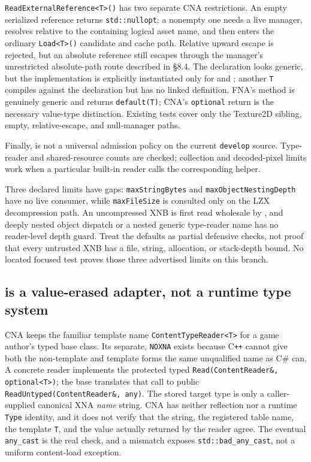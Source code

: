 \texttt{ReadExternalReference<T>()} has two separate CNA restrictions. An empty serialized
reference returns \texttt{std::nullopt}; a nonempty one needs a live manager, resolves relative to
the containing logical asset name, and then enters the ordinary \texttt{Load<T>()} candidate and
cache path. Relative upward escape is rejected, but an absolute reference still escapes through
the manager's unrestricted absolute-path route described in \S8.4. The declaration looks generic,
but the implementation is explicitly instantiated only for  and
; another \texttt{T} compiles against the declaration but has no linked
definition. FNA's method is genuinely generic and returns \texttt{default(T)}; CNA's
\texttt{optional} return is the necessary value-type distinction. Existing tests cover only the
Texture2D sibling, empty, relative-escape, and null-manager paths.

Finally,  is not a universal admission policy on the current
\texttt{develop} source. Type-reader and shared-resource counts are checked; collection and
decoded-pixel limits work when a particular built-in reader calls the corresponding helper.

Three declared limits have gaps: \texttt{maxStringBytes} and
\texttt{maxObjectNestingDepth} have no live consumer, while \texttt{maxFileSize} is consulted
only on the LZX decompression path. An uncompressed XNB is first read wholesale by
, and deeply nested object dispatch or a nested generic type-reader name
has no reader-level depth guard. Treat the defaults as partial defensive checks, not proof that
every untrusted XNB has a file, string, allocation, or stack-depth bound. No located focused test
proves those three advertised limits on this branch.

\subsection{ is a value-erased adapter, not a runtime type system}
\label{sec:content-type-reader-contract}

CNA keeps the familiar template name \texttt{ContentTypeReader<T>} for a game author's typed
base class. Its separate, \texttt{NOXNA}  exists because C\texttt{++}
cannot give both the non-template and template forms the same unqualified name as C\# can. A
concrete reader implements the protected typed \texttt{Read(ContentReader\&, optional<T>)}; the
base translates that call to public \texttt{ReadUntyped(ContentReader\&, any)}. The stored target
type is only a caller-supplied canonical XNA \emph{name} string. CNA has neither reflection nor a
runtime \texttt{Type} identity, and it does not verify that the string, the registered table name,
the template \texttt{T}, and the value actually returned by the reader agree. The eventual
\texttt{any\_cast} is the real check, and a mismatch exposes \texttt{std::bad\_any\_cast}, not a
uniform content-load exception.

